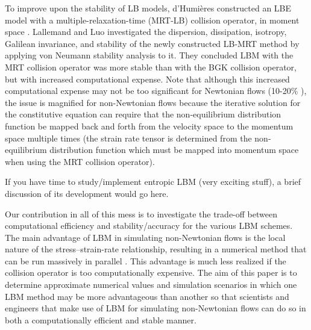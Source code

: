 \documentclass{article}
\begin{document}
To improve upon the stability of LB models, d'Humi\`{e}res constructed an LBE model with a multiple-relaxation-time (MRT-LB) collision operator, in moment space \cite{d1994generalized}. %
Lallemand and Luo investigated the dispersion, dissipation, isotropy, Galilean invariance, and stability of the newly constructed LB-MRT method by applying von Neumann stability analysis to it\cite{lallemand2000theory}.
They concluded LBM with the MRT collision operator was more stable than with the BGK collision operator, but with increased computational expense. %
Note that although this increased computational expense may not be too significant for Newtonian flows (10-20\% \cite{lallemand2000theory}), the issue is magnified for non-Newtonian flows because the iterative solution for the constitutive equation can require that the non-equilibrium distribution function be mapped back and forth from the velocity space to the momentum space multiple times (the strain rate tensor is determined from the non-equilibrium distribution function which must be mapped into momentum space when using the MRT collision operator). %

{\color{red} If you have time to study/implement entropic LBM (very exciting stuff), a brief discussion of its development would go here.}

Our contribution in all of this mess is to investigate the trade-off between computational efficiency and stability/accuracy for the various LBM schemes.
The main advantage of LBM in simulating non-Newtonian flows is the local nature of the stress--strain-rate relationship, resulting in a numerical method that can be run massively in parallel \cite{something}.
This advantage is much less realized if the collision operator is too computationally expensive.
The aim of this paper is to determine approximate numerical values and simulation scenarios in which one LBM method may be more advantageous than another so that scientists and engineers that make use of LBM for simulating non-Newtonian flows can do so in both a computationally efficient and stable manner. %
\end{document}
